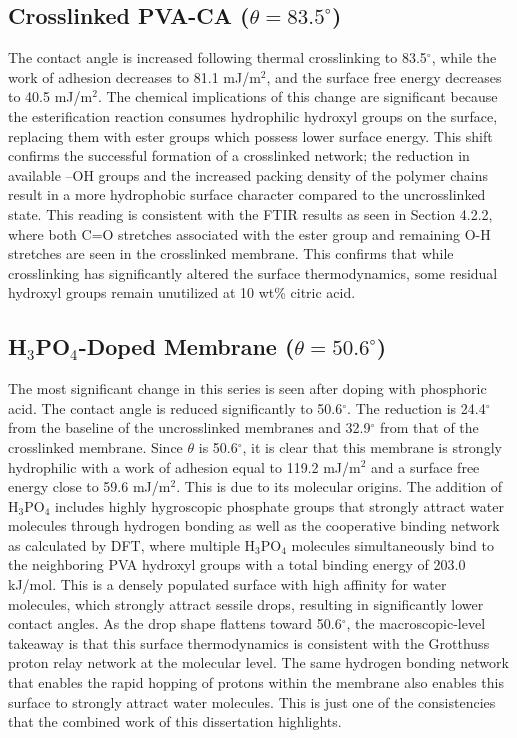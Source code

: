 \documentclass[12pt,a4paper]{report}
\begin{document}
\subsection{Crosslinked PVA-CA ($\theta = 83.5^\circ$)}
The contact angle is increased following thermal crosslinking to 83.5$^\circ$, while the work of adhesion decreases to 81.1 mJ/m$^2$, and the surface free energy decreases to 40.5 mJ/m$^2$. The chemical implications of this change are significant because the esterification reaction consumes hydrophilic hydroxyl groups on the surface, replacing them with ester groups which possess lower surface energy. This shift confirms the successful formation of a crosslinked network; the reduction in available –OH groups and the increased packing density of the polymer chains result in a more hydrophobic surface character compared to the uncrosslinked state.\cite{35, 53} This reading is consistent with the FTIR results as seen in Section 4.2.2, where both C=O stretches associated with the ester group and remaining O-H stretches are seen in the crosslinked membrane. This confirms that while crosslinking has significantly altered the surface thermodynamics, some residual hydroxyl groups remain unutilized at 10 wt\% citric acid.

\subsection{H$_3$PO$_4$-Doped Membrane ($\theta = 50.6^\circ$)}
The most significant change in this series is seen after doping with phosphoric acid. The contact angle is reduced significantly to 50.6$^\circ$. The reduction is 24.4$^\circ$ from the baseline of the uncrosslinked membranes and 32.9$^\circ$ from that of the crosslinked membrane. Since $\theta$ is 50.6$^\circ$, it is clear that this membrane is strongly hydrophilic with a work of adhesion equal to 119.2 mJ/m$^2$ and a surface free energy close to 59.6 mJ/m$^2$. This is due to its molecular origins. The addition of H$_3$PO$_4$ includes highly hygroscopic phosphate groups that strongly attract water molecules through hydrogen bonding as well as the cooperative binding network as calculated by DFT, where multiple H$_3$PO$_4$ molecules simultaneously bind to the neighboring PVA hydroxyl groups with a total binding energy of 203.0 kJ/mol. This is a densely populated surface with high affinity for water molecules, which strongly attract sessile drops, resulting in significantly lower contact angles.\cite{21, 55} As the drop shape flattens toward 50.6$^\circ$, the macroscopic-level takeaway is that this surface thermodynamics is consistent with the Grotthuss proton relay network at the molecular level. The same hydrogen bonding network that enables the rapid hopping of protons within the membrane also enables this surface to strongly attract water molecules. This is just one of the consistencies that the combined work of this dissertation highlights.\cite{21, 55, 71}
\end{document}
